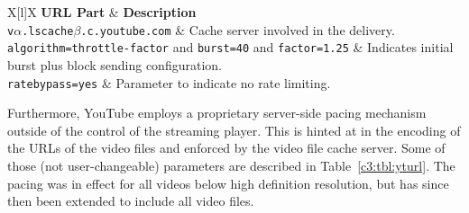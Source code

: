 \begin{table}[htb]
\caption{Transmission Related Parameters from YouTube's Video URL Setup}
\label{c3:tbl:yturl}
	\centering
	\begin{tabu}{X[l]X}
		\toprule
		\textbf{\gls{URL} Part} & \textbf{Description} \\ 
		\midrule
		\texttt{v$\alpha$.lscache$\beta$.c.youtube.com} &  Cache server involved in the delivery.\\
		\texttt{algorithm=throttle-factor} and \texttt{burst=40} and \texttt{factor=1.25} & Indicates initial burst plus block sending configuration. \\
		\texttt{ratebypass=yes} & Parameter to indicate no rate limiting.\\
		\bottomrule
	\end{tabu}
\end{table}

Furthermore, YouTube employs a proprietary server-side pacing mechanism outside of the control of the streaming player. This is hinted at in the encoding of the \glspl{URL} of the video files and enforced by the video file cache server. Some of those (not user-changeable) parameters are described in Table~\ref{c3:tbl:yturl}. The pacing was in effect for all videos below high definition resolution, but has since then been extended to include all video files. 

